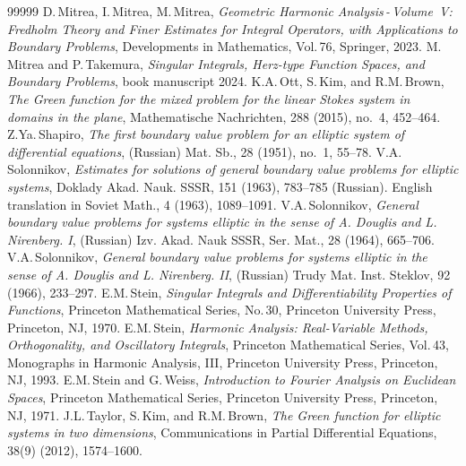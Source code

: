 \documentclass[11pt,reqno]{amsart}
\numberwithin{equation}{section}
\theoremstyle{remark}
\begin{document}
\begin{thebibliography}{99999}
%
 D.\,Mitrea, I.\,Mitrea, M.\,Mitrea, 
{\it Geometric Harmonic Analysis\,-\,Volume~V: Fredholm Theory and Finer Estimates for Integral Operators, 
with Applications to Boundary Problems}, Developments in Mathematics, Vol.\,76, Springer, 2023.
%
 M.\,Mitrea and P.\,Takemura, \textit{Singular Integrals, Herz-type Function Spaces, and Boundary Problems}, book manuscript 2024.
%
 K.A.\,Ott, S.\,Kim, and R.M.\,Brown, {\it The Green function for the mixed problem for the linear Stokes system in domains in the plane}, 
Mathematische Nachrichten, 288 (2015), no.~4, 452--464.
%
 Z.Ya.\,Shapiro, {\it The first boundary value problem for an elliptic system 
of differential equations}, (Russian) Mat. Sb., 28 (1951), no.~1, 55--78. 
%
 V.A.\,Solonnikov, {\it Estimates for solutions of general boundary
value problems for elliptic systems}, Doklady Akad. Nauk. SSSR, 151 (1963), 783--785
(Russian). English translation in Soviet Math., 4 (1963), 1089--1091.
%
 V.A.\,Solonnikov, {\it General boundary value problems
for systems elliptic in the sense of A. Douglis and L. Nirenberg. I},
(Russian) Izv. Akad. Nauk SSSR, Ser. Mat., 28 (1964), 665--706.
%
 V.A.\,Solonnikov, {\it General boundary value problems for
systems elliptic in the sense of A. Douglis and L. Nirenberg. II}, (Russian)
Trudy Mat. Inst. Steklov, 92 (1966), 233--297.
%
 E.M.\,Stein, {\it Singular Integrals and Differentiability
Properties of Functions}, Princeton Mathematical Series, No.\,30,
Princeton University Press, Princeton, NJ, 1970.
%
 E.M.\,Stein, {\it Harmonic Analysis: Real-Variable Methods,
Orthogonality, and Oscillatory Integrals}, Princeton Mathematical Series,
Vol.\,43, Monographs in Harmonic Analysis, III, Princeton University Press,
Princeton, NJ, 1993.
%
 E.M.\,Stein and G.\,Weiss, {\it Introduction to Fourier Analysis
on Euclidean Spaces}, Princeton Mathematical Series, Princeton University Press, 
Princeton, NJ, 1971.
%
 J.L.\,Taylor, S.\,Kim, and R.M.\,Brown, {\it The Green function for elliptic systems in two dimensions}, 
Communications in Partial Differential Equations, 38(9) (2012), 1574--1600.
%
\end{thebibliography}
\end{document}
